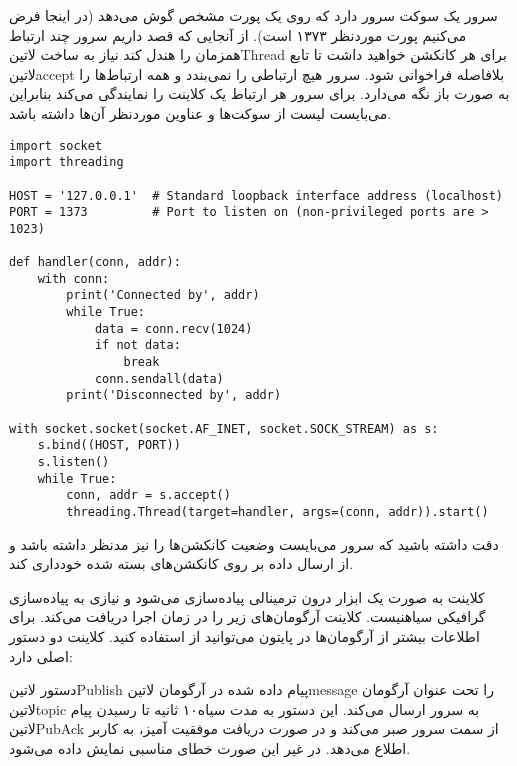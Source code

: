 \documentclass[]{article}
\begin{document}

  سرور یک سوکت سرور دارد که روی یک پورت مشخص گوش می‌دهد (در اینجا فرض می‌کنیم پورت موردنظر ۱۳۷۳ است). از آنجایی که قصد داریم سرور چند ارتباط همزمان را هندل کند نیاز به ساخت ‌لاتین{Thread} برای هر کانکشن خواهید داشت
  تا تابع ‌لاتین{accept} بلافاصله فراخوانی شود. سرور هیچ ارتباطی را نمی‌بندد و همه ارتباط‌ها را به صورت باز نگه می‌دارد. برای سرور هر ارتباط یک کلاینت را نمایندگی می‌کند بنابراین می‌بایست لیست از سوکت‌ها و عناوین موردنظر آن‌ها داشته باشد.

  \begin{latin}
  \begin{verbatim}
import socket
import threading

HOST = '127.0.0.1'  # Standard loopback interface address (localhost)
PORT = 1373         # Port to listen on (non-privileged ports are > 1023)

def handler(conn, addr):
    with conn:
        print('Connected by', addr)
        while True:
            data = conn.recv(1024)
            if not data:
                break
            conn.sendall(data)
        print('Disconnected by', addr)

with socket.socket(socket.AF_INET, socket.SOCK_STREAM) as s:
    s.bind((HOST, PORT))
    s.listen()
    while True:
        conn, addr = s.accept()
        threading.Thread(target=handler, args=(conn, addr)).start()
  \end{verbatim}
  \end{latin}

  دقت داشته باشید که سرور می‌بایست وضعیت کانکشن‌ها را نیز مدنظر داشته باشد و از ارسال داده بر روی کانکشن‌های بسته شده خودداری کند.


  کلاینت به صورت یک ابزار درون ترمینالی پیاده‌سازی می‌شود و نیازی به پیاده‌سازی گرافیکی ‌سیاه{نیست}.
  کلاینت آرگومان‌های زیر را در زمان اجرا دریافت می‌کند. برای اطلاعات بیشتر از آرگومان‌ها در پایتون می‌توانید از  استفاده کنید.
  کلاینت دو دستور اصلی دارد:

  دستور ‌لاتین{Publish} پیام داده شده در آرگومان ‌لاتین{message} را تحت عنوان آرگومان ‌لاتین{topic} به سرور ارسال می‌کند.
  این دستور به مدت ‌سیاه{۱۰ ثانیه} تا رسیدن پیام ‌لاتین{PubAck} از سمت سرور صبر می‌کند و در صورت دریافت موفقیت آمیز، به کاربر اطلاع می‌دهد.
  در غیر این صورت خطای مناسبی نمایش داده می‌شود.
\end{document}
